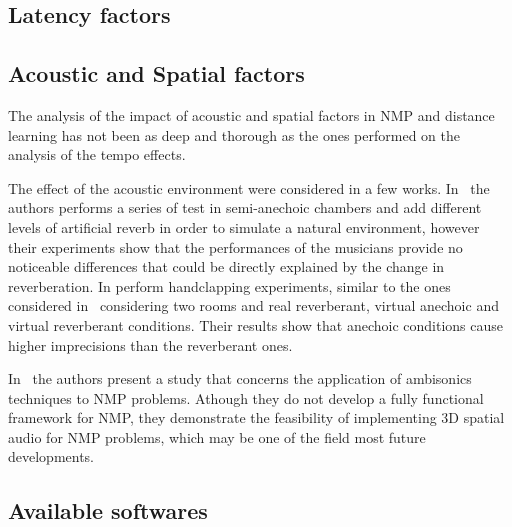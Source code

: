 \subsection{Latency factors}
\subsection{Acoustic and Spatial factors}
The analysis of the impact of acoustic and spatial factors in NMP and distance learning has not been as deep and thorough as the ones performed on the analysis of the tempo effects. 

The effect of the acoustic environment were considered in a few works. In~\cite{carot2009towards} the authors performs a series of test in semi-anechoic chambers and add different levels of artificial reverb in order to simulate a natural environment, however their experiments show that the performances of the musicians provide no noticeable differences that could be directly explained by the change in reverberation. In \cite{FarnerReverb} perform handclapping experiments, similar to the ones considered in~\cite{Chafe1} considering two rooms and real reverberant, virtual anechoic and virtual reverberant conditions. Their results show that anechoic conditions cause higher imprecisions than the reverberant ones.



In~\cite{gurevich2011ambisonic} the authors present a study that concerns the application of ambisonics techniques to NMP problems. Athough they do not develop a fully functional framework for NMP, they demonstrate the feasibility of implementing 3D spatial audio for NMP problems, which may be one of the field most future developments.


\subsection{Available softwares}
